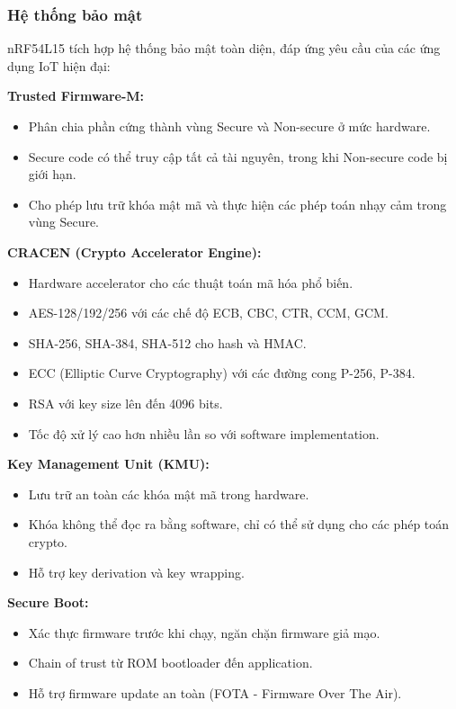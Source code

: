\subsubsection{Hệ thống bảo mật}

nRF54L15 tích hợp hệ thống bảo mật toàn diện, đáp ứng yêu cầu của các ứng dụng IoT hiện đại:

\textbf{Trusted Firmware-M:}
\begin{itemize}
    \item Phân chia phần cứng thành vùng Secure và Non-secure ở mức hardware.
    \item Secure code có thể truy cập tất cả tài nguyên, trong khi Non-secure code bị giới hạn.
    \item Cho phép lưu trữ khóa mật mã và thực hiện các phép toán nhạy cảm trong vùng Secure.
\end{itemize}

\textbf{CRACEN (Crypto Accelerator Engine):}
\begin{itemize}
    \item Hardware accelerator cho các thuật toán mã hóa phổ biến.
    \item AES-128/192/256 với các chế độ ECB, CBC, CTR, CCM, GCM.
    \item SHA-256, SHA-384, SHA-512 cho hash và HMAC.
    \item ECC (Elliptic Curve Cryptography) với các đường cong P-256, P-384.
    \item RSA với key size lên đến 4096 bits.
    \item Tốc độ xử lý cao hơn nhiều lần so với software implementation.
\end{itemize}

\textbf{Key Management Unit (KMU):}
\begin{itemize}
    \item Lưu trữ an toàn các khóa mật mã trong hardware.
    \item Khóa không thể đọc ra bằng software, chỉ có thể sử dụng cho các phép toán crypto.
    \item Hỗ trợ key derivation và key wrapping.
\end{itemize}

\textbf{Secure Boot:}
\begin{itemize}
    \item Xác thực firmware trước khi chạy, ngăn chặn firmware giả mạo.
    \item Chain of trust từ ROM bootloader đến application.
    \item Hỗ trợ firmware update an toàn (FOTA - Firmware Over The Air).
\end{itemize}

